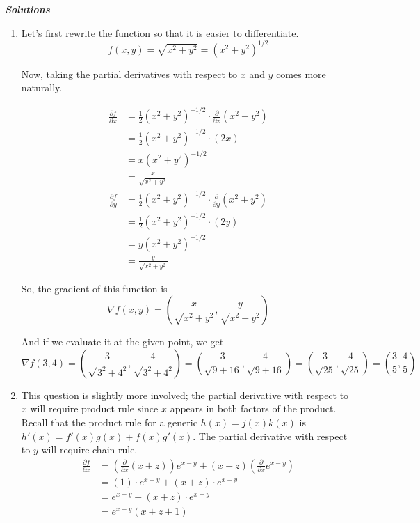 \documentclass[10pt]{amsart}
\begin{document}
\textit{\textbf{Solutions}}
\begin{enumerate}
\item Let's first rewrite the function so that it is easier to differentiate.
$$f(x,y) = \sqrt{x^2 + y^2} = (x^2 + y^2)^{1/2}$$

Now, taking the partial derivatives with respect to $x$ and $y$ comes more naturally.

\begin{align*}
\frac{\partial f}{\partial x} &= \frac{1}{2}(x^2 + y^2)^{-1/2} \cdot \frac{\partial}{\partial x} (x^2 + y^2) \\
&= \frac{1}{2}(x^2 + y^2)^{-1/2} \cdot (2x) \\
&= x (x^2 + y^2)^{-1/2} \\
&= \frac{x}{\sqrt{x^2 + y^2}}
\end{align*}
\begin{align*}
\frac{\partial f}{\partial y} &= \frac{1}{2}(x^2 + y^2)^{-1/2} \cdot \frac{\partial}{\partial y} (x^2 + y^2) \\
&= \frac{1}{2}(x^2 + y^2)^{-1/2} \cdot (2y) \\
&= y (x^2 + y^2)^{-1/2} \\
&= \frac{y}{\sqrt{x^2 + y^2}}
\end{align*}

So, the gradient of this function is
\medskip
\begin{equation*}
\nabla f(x,y) = \left(\frac{x}{\sqrt{x^2 + y^2}}, \frac{y}{\sqrt{x^2 + y^2}}\right)
\end{equation*}

And if we evaluate it at the given point, we get
\medskip
\begin{equation*}
\nabla f(3,4) = \left(\frac{3}{\sqrt{3^2 + 4^2}}, \frac{4}{\sqrt{3^2 + 4^2}}\right) = \left(\frac{3}{\sqrt{9 + 16}}, \frac{4}{\sqrt{9 + 16}}\right) = \left(\frac{3}{\sqrt{25}}, \frac{4}{\sqrt{25}}\right) = \left(\frac{3}{5}, \frac{4}{5}\right) 
\end{equation*}

\item This question is slightly more involved; the partial derivative with respect to $x$ will require product rule since $x$ appears in both factors of the product. Recall that the product rule for a generic $h(x) = j(x)k(x)$ is $h'(x) = f'(x)g(x) + f(x)g'(x)$. The partial derivative with respect to $y$ will require chain rule.
\medskip
\begin{align*}
\frac{\partial f}{\partial x} &= \left(\frac{\partial}{\partial x}(x+z)\right) e^{x-y} + (x+z) \left(\frac{\partial}{\partial x} e^{x-y}\right)\\
&= (1) \cdot e^{x-y} + (x+z) \cdot e^{x-y}\\
&= e^{x-y} + (x+z) \cdot e^{x-y}\\
&= e^{x-y} (x+z+1)
\end{align*}


\end{enumerate}
\end{document}

